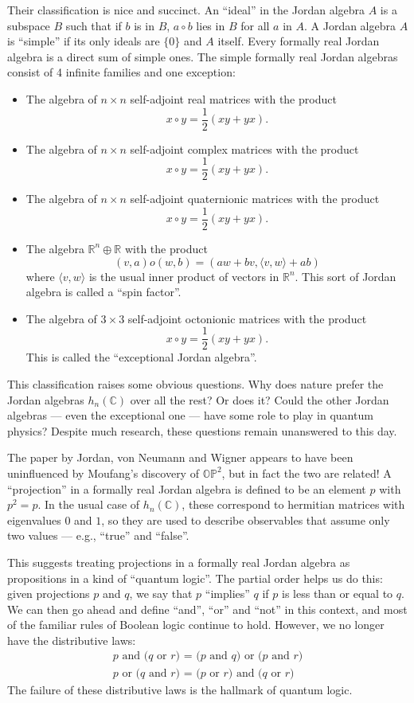 \documentclass{article}
\def\tightlist{}
\begin{document}
Their classification is nice and succinct. An ``ideal'' in the Jordan
algebra \(A\) is a subspace \(B\) such that if \(b\) is in \(B\),
\(a\circ b\) lies in \(B\) for all \(a\) in \(A\). A Jordan algebra
\(A\) is ``simple'' if its only ideals are \(\{0\}\) and \(A\) itself.
Every formally real Jordan algebra is a direct sum of simple ones. The
simple formally real Jordan algebras consist of 4 infinite families and
one exception:

\begin{itemize}
\tightlist
\item
  The algebra of \(n\times n\) self-adjoint real matrices with the
  product \[x\circ y = \frac12(xy + yx).\]
\item
  The algebra of \(n\times n\) self-adjoint complex matrices with the
  product \[x\circ y = \frac12(xy + yx).\]
\item
  The algebra of \(n\times n\) self-adjoint quaternionic matrices with
  the product \[x\circ y = \frac12(xy + yx).\]
\item
  The algebra \(\mathbb{R}^n\oplus\mathbb{R}\) with the product
  \[(v,a) o (w,b) = (aw + bv, \langle v,w\rangle + ab)\] where
  \(\langle v,w\rangle\) is the usual inner product of vectors in
  \(\mathbb{R}^n\). This sort of Jordan algebra is called a ``spin
  factor''.
\item
  The algebra of \(3\times3\) self-adjoint octonionic matrices with the
  product \[x\circ y = \frac12(xy + yx).\] This is called the
  ``exceptional Jordan algebra''.
\end{itemize}

This classification raises some obvious questions. Why does nature
prefer the Jordan algebras \(h_n(\mathbb{C})\) over all the rest? Or
does it? Could the other Jordan algebras --- even the exceptional one
--- have some role to play in quantum physics? Despite much research,
these questions remain unanswered to this day.

The paper by Jordan, von Neumann and Wigner appears to have been
uninfluenced by Moufang's discovery of \(\mathbb{OP}^2\), but in fact
the two are related! A ``projection'' in a formally real Jordan algebra
is defined to be an element \(p\) with \(p^2 = p\). In the usual case of
\(h_n(\mathbb{C})\), these correspond to hermitian matrices with
eigenvalues \(0\) and \(1\), so they are used to describe observables
that assume only two values --- e.g., ``true'' and ``false''.

This suggests treating projections in a formally real Jordan algebra as
propositions in a kind of ``quantum logic''. The partial order helps us
do this: given projections \(p\) and \(q\), we say that \(p\)
``implies'' \(q\) if \(p\) is less than or equal to \(q\). We can then
go ahead and define ``and'', ``or'' and ``not'' in this context, and
most of the familiar rules of Boolean logic continue to hold. However,
we no longer have the distributive laws: \[
  \begin{gathered}
    \mbox{$p$ and ($q$ or $r$) = ($p$ and $q$) or ($p$ and $r$)}
  \\\mbox{$p$ or ($q$ and $r$) = ($p$ or $r$) and ($q$ or $r$)}
  \end{gathered}
\] The failure of these distributive laws is the hallmark of quantum
logic.
\end{document}
